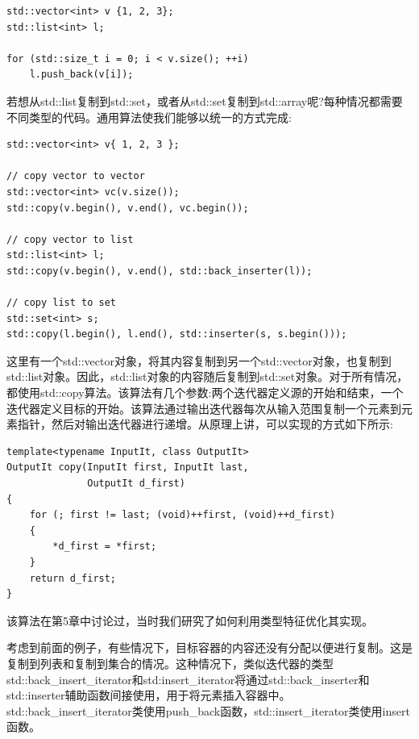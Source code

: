 \begin{lstlisting}[style=styleCXX]
std::vector<int> v {1, 2, 3};
std::list<int> l;

for (std::size_t i = 0; i < v.size(); ++i)
	l.push_back(v[i]);
\end{lstlisting}

若想从std::list复制到std::set，或者从std::set复制到std::array呢?每种情况都需要不同类型的代码。通用算法使我们能够以统一的方式完成:

\begin{lstlisting}[style=styleCXX]
std::vector<int> v{ 1, 2, 3 };

// copy vector to vector
std::vector<int> vc(v.size());
std::copy(v.begin(), v.end(), vc.begin());

// copy vector to list
std::list<int> l;
std::copy(v.begin(), v.end(), std::back_inserter(l));

// copy list to set
std::set<int> s;
std::copy(l.begin(), l.end(), std::inserter(s, s.begin()));
\end{lstlisting}

这里有一个std::vector对象，将其内容复制到另一个std::vector对象，也复制到std::list对象。因此，std::list对象的内容随后复制到std::set对象。对于所有情况，都使用std::copy算法。该算法有几个参数:两个迭代器定义源的开始和结束，一个迭代器定义目标的开始。该算法通过输出迭代器每次从输入范围复制一个元素到元素指针，然后对输出迭代器进行递增。从原理上讲，可以实现的方式如下所示:

\begin{lstlisting}[style=styleCXX]
template<typename InputIt, class OutputIt>
OutputIt copy(InputIt first, InputIt last,
			  OutputIt d_first)
{
	for (; first != last; (void)++first, (void)++d_first)
	{
		*d_first = *first;
	}
	return d_first;
}
\end{lstlisting}

\begin{tcolorbox}[breakable,enhanced jigsaw,colback=blue!5!white,colframe=blue!75!black,title={重要的Note}]
该算法在第5章中讨论过，当时我们研究了如何利用类型特征优化其实现。
\end{tcolorbox}

考虑到前面的例子，有些情况下，目标容器的内容还没有分配以便进行复制。这是复制到列表和复制到集合的情况。这种情况下，类似迭代器的类型std::back\_insert\_iterator和std:insert\_iterator将通过std::back\_inserter和std::inserter辅助函数间接使用，用于将元素插入容器中。std::back\_insert\_iterator类使用push\_back函数，std::insert\_iterator类使用insert函数。


